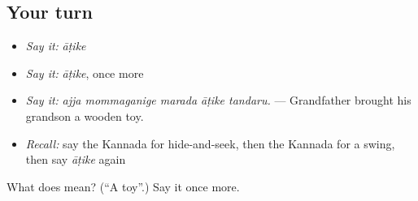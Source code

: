 \subsection*{Your turn}
\begin{itemize}
\raggedright
  \item \emph{Say it:} \emph{āṭike}
  \item \emph{Say it:} \emph{āṭike}, once more
  \item \emph{Say it:} \emph{ajja mommaganige marada āṭike tandaru.} — Grandfather brought his grandson a wooden toy.
  \item \emph{Recall:} say the Kannada for hide-and-seek, then the Kannada for a swing, then say \emph{āṭike} again
\end{itemize}

\begin{tcolorbox}[breakable,colback=teal!4,colframe=teal!35!black,title={Before you move on}]
What does  mean? (\textquotedblleft{}A toy\textquotedblright{}.) Say it once more.
\end{tcolorbox}

